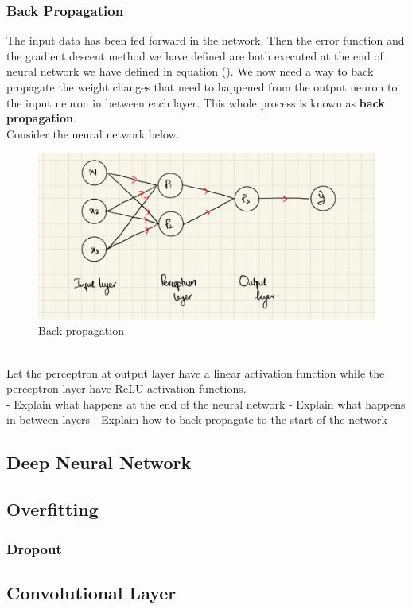 \subsubsection{Back Propagation}
The input data has been fed forward in the network. Then the error function and the gradient descent method we have defined are both executed at the end of neural network we have defined in equation (). We now need a way to back propagate the weight changes that need to happened from the output neuron to the input neuron in between each layer. This whole process is known as \textbf{back propagation}.\\
Consider the neural network below.
\begin{figure}[ht]
  \centering
  \includegraphics[scale=0.15]{CHAPTER_2/c2_fig_back_prog.jpeg}
  \caption{Back propagation}
  \label{}
\end{figure}\vspace{50mm} \\
Let the perceptron at output layer have a linear activation function while the perceptron layer have ReLU activation functions. \\
- Explain what happens at the end of the neural network
- Explain what happens in between layers
- Explain how to back propagate to the start of the network

\subsection{Deep Neural Network}
\subsection{Overfitting}
\subsubsection{Dropout}
\subsection{Convolutional Layer} 